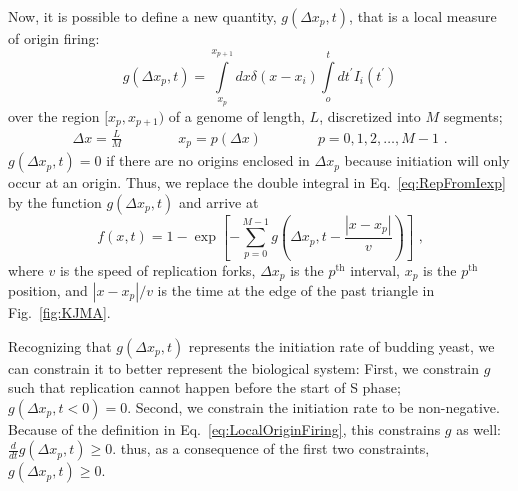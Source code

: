 		Now, it is possible to define a new quantity, $g(\Delta x_p,t)$, that is a local measure of origin firing:
		\begin{equation} \label{eq:LocalOriginFiring}
			g\left(\Delta x_p,t\right) = \int\limits_{x_p}^{x_{p+1}} dx \delta\left( x-x_i\right) \int\limits_o^t dt^\prime I_i\left( t^\prime\right)
		\end{equation}
		over the region $[x_p, x_{p+1})$ of a genome of length, $L$, discretized into $M$ segments;
		\begin{align}
			\Delta x = \frac{L}{M} \qquad\qquad x_p = p\left(\Delta x\right) \qquad\qquad p = 0, 1, 2, \ldots , M-1 \text{ .}
		\end{align}
		$g(\Delta x_p,t)=0$ if there are no origins enclosed in $\Delta x_p$ because initiation will only occur at an origin.
		Thus, we replace the double integral in Eq.~\ref{eq:RepFromIexp} by the function $g(\Delta x_p,t)$ and arrive at
		\begin{equation} \label{eq:RepFromG}
			f\left( x,t\right) = 1 - \exp\left[ - \sum\limits_{p=0}^{M-1}g\left(\Delta x_p,t-\frac{\left| x-x_p \right|}{v}\right)\right] \text{ ,}
		\end{equation}
		where $v$ is the speed of replication forks, $\Delta x_p$ is the $p^\text{th}$ interval, $x_p$ is the $p^\text{th}$ position, and $\left| x-x_p \right|/v$ is the time at the edge of the past triangle in Fig.~\ref{fig:KJMA}.
		
		Recognizing that $g(\Delta x_p,t)$ represents the initiation rate of budding yeast, we can constrain it to better represent the biological system:
		First, we constrain $g$ such that replication cannot happen before the start of S phase; $g(\Delta x_p,t<0)=0$.
		Second, we constrain the initiation rate to be non-negative. Because of the definition in Eq.~\ref{eq:LocalOriginFiring}, this constrains $g$ as well: $\frac{d}{dt}g(\Delta x_p,t)\geq 0$.
		thus, as a consequence of the first two constraints, $g(\Delta x_p,t)\geq 0$.
		
